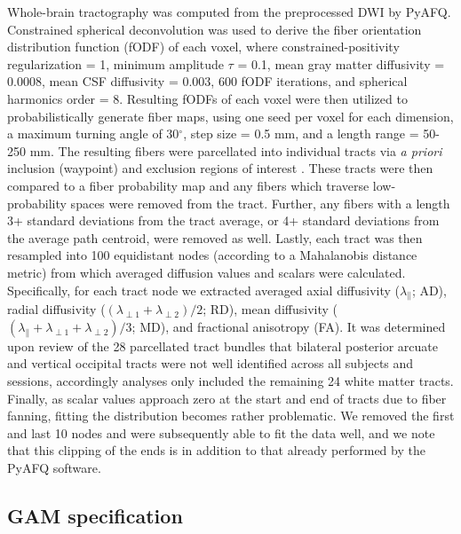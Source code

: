 \documentclass[12pt]{article}
\begin{document}
Whole-brain tractography was computed from the preprocessed DWI by PyAFQ. Constrained spherical deconvolution was used to derive the fiber orientation distribution function (fODF) of each voxel, where constrained-positivity regularization = 1, minimum amplitude $\tau$ = 0.1, mean gray matter diffusivity = 0.0008, mean CSF diffusivity = 0.003, 600 fODF iterations, and spherical harmonics order = 8. Resulting fODFs of each voxel were then utilized to probabilistically generate fiber maps, using one seed per voxel for each dimension, a maximum turning angle of 30$^\circ$, step size = 0.5 mm, and a length range = 50-250 mm. The resulting fibers were parcellated into individual tracts via \textit{a priori} inclusion (waypoint) and exclusion regions of interest \parencite{wakana2007ReproducibilityQuantitativeTractography}. These tracts were then compared to a fiber probability map \parencite{hua2008TractProbabilityMaps} and any fibers which traverse low-probability spaces were removed from the tract. Further, any fibers with a length 3+ standard deviations from the tract average, or 4+ standard deviations from the average path centroid, were removed as well. Lastly, each tract was then resampled into 100 equidistant nodes (according to a Mahalanobis distance metric) from which averaged diffusion values and scalars were calculated. Specifically, for each tract node we extracted averaged axial diffusivity ($\lambda_\parallel$; AD), radial diffusivity ($(\lambda_{\perp1}+\lambda_{\perp2})/2$; RD), mean diffusivity ($(\lambda_\parallel+\lambda_{\perp1}+\lambda_{\perp2})/3$; MD), and fractional anisotropy (FA). It was determined upon review of the 28 parcellated tract bundles that bilateral posterior arcuate and vertical occipital tracts were not well identified across all subjects and sessions, accordingly analyses only included the remaining 24 white matter tracts. Finally, as scalar values approach zero at the start and end of tracts due to fiber fanning, fitting the distribution becomes rather problematic. We removed the first and last 10 nodes and were subsequently able to fit the data well, and we note that this clipping of the ends is in addition to that already performed by the PyAFQ software.



\subsection{GAM specification}
\label{ssec:meth-gam}
\end{document}
